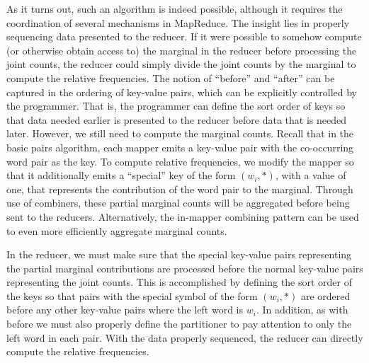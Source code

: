 As it turns out, such an algorithm is indeed possible, although it
requires the coordination of several mechanisms in MapReduce.  The
insight lies in properly sequencing data presented to the reducer.  If
it were possible to somehow compute (or otherwise obtain access to)
the marginal in the reducer before processing the joint counts, the
reducer could simply divide the joint counts by the marginal to
compute the relative frequencies.  The notion of ``before'' and
``after'' can be captured in the ordering of key-value pairs, which
can be explicitly controlled by the programmer.  That is, the
programmer can define the sort order of keys so that data needed
earlier is presented to the reducer before data that is needed later.
However, we still need to compute the marginal counts.  Recall that in
the basic pairs algorithm, each mapper emits a key-value pair with the
co-occurring word pair as the key.  To compute relative frequencies,
we modify the mapper so that it additionally emits a ``special'' key
of the form $(w_i, \ast)$, with a value of one, that represents the
contribution of the word pair to the marginal.  Through use of
combiners, these partial marginal counts will be aggregated before
being sent to the reducers.  Alternatively, the in-mapper combining
pattern can be used to even more efficiently aggregate marginal
counts.

In the reducer, we must make sure that the special key-value pairs
representing the partial marginal contributions are processed before
the normal key-value pairs representing the joint counts.  This is
accomplished by defining the sort order of the keys so that pairs with
the special symbol of the form $(w_i, \ast)$ are ordered before any other
key-value pairs where the left word is $w_i$.  In addition, as with
before we must also properly define the partitioner to pay attention
to only the left word in each pair.  With the data properly sequenced,
the reducer can directly compute the relative frequencies.

